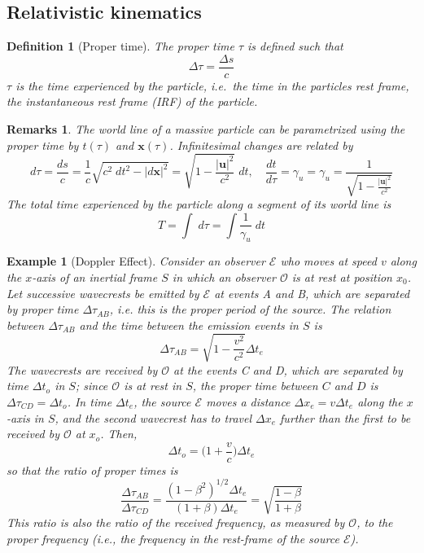 \documentclass[a4paper]{article}
\newtheorem{eg}{Example}[section]
\newtheorem{remarks}{Remarks}[section]
\theoremstyle{new}
\newtheorem{defi}{Definition}[section]
\begin{document}
\subsection{Relativistic kinematics}
\begin{defi}[Proper time]
  The proper time $\tau$ is defined such that
$$\Delta \tau = \frac{\Delta s}{c}$$
  $\tau$ is the time experienced by the particle, i.e.\ the time in the particles rest frame, the instantaneous rest frame (IRF) of the particle.
\end{defi}
\begin{remarks}
The world line of a massive particle can be parametrized using the proper time by $t(\tau)$ and $\mathbf{x}(\tau)$. Infinitesimal changes are related by
$$d \tau = \frac{d s}{c} = \frac{1}{c}\sqrt{c^2\;d t^2 - |d \mathbf{x}|^2} = \sqrt{1 - \frac{|\mathbf{u}|^2}{c^2}}\;d t,\quad\frac{d t}{d \tau} = \gamma_u=  \gamma_u = \frac{1}{\sqrt{1 - \frac{|\mathbf{u}|^2}{c^2}}}$$
The total time experienced by the particle along a segment of its world line is
$$T = \int \;d \tau = \int\frac{1}{\gamma_u}\;d t$$
\end{remarks}
\begin{eg}[Doppler Effect]
Consider an observer $\mathcal{E}$ who moves at speed $v$ along the $x$-axis of an inertial frame $S$ in which an observer $\mathcal{O}$ is at rest at position $x_0$. Let successive wavecrests be emitted by $\mathcal{E}$ at events A and B, which are separated by proper time $\Delta\tau_{AB}$, i.e. this is the proper period of the source. The relation between $\Delta\tau_{AB}$ and the time between the emission events in $S$ is
$$\Delta\tau_{AB}=\sqrt{1-\frac{v^2}{c^2}}\Delta t_e$$
The wavecrests are received by $\mathcal{O}$ at the events C and D, which are separated by time $\Delta t_o$ in $S$; since $\mathcal{O}$ is at rest in $S$, the proper time between $C$ and $D$ is $\Delta\tau_{CD}=\Delta t_o$. In time $\Delta t_e$, the source $\mathcal{E}$ moves a distance $\Delta x_e=v\Delta t_e$ along the $x$-axis in $S$, and the second wavecrest has to travel $\Delta x_e$ further than the first to be received by $\mathcal{O}$ at $x_o$. Then,
$$\Delta t_o=\bigg(1+\frac{v}{c}\bigg)\Delta t_e$$
so that the ratio of proper times is
$$\frac{\Delta\tau_{AB}}{\Delta\tau_{CD}}=\frac{(1-\beta^2)^{1/2}\Delta t_e}{(1+\beta)\Delta t_e}=\sqrt{\frac{1-\beta}{1+\beta}}$$
This ratio is also the ratio of the received frequency, as measured by $\mathcal{O}$, to the proper frequency (i.e., the frequency in the rest-frame of the source $\mathcal{E}$).
\end{eg}
\end{document}
